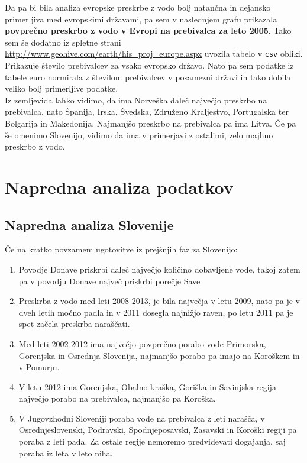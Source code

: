 \documentclass[11pt,a4paper]{article}
\begin{document}

\newpage

Da pa bi bila analiza evropske preskrbe z vodo bolj natančna in dejansko primerljiva med evropskimi državami, pa sem v naslednjem grafu prikazala \textbf{povprečno preskrbo z vodo v Evropi na prebivalca za leto 2005}. Tako sem še dodatno iz spletne strani \url{http://www.geohive.com/earth/his_proj_europe.aspx} uvozila tabelo v \verb|csv| obliki. Prikazuje število prebivalcev za vsako evropsko državo. Nato pa sem podatke iz tabele euro normirala z številom prebivalcev v posamezni državi in tako dobila veliko bolj primerljive podatke.\\

Iz zemljevida lahko vidimo, da ima Norveška daleč največjo preskrbo na prebivalca, nato Španija, Irska, Švedska, Združeno Kraljestvo, Portugalska ter Bolgarija in Makedonija. Najmanjšo preskrbo na prebivalca pa ima Litva.
Če pa še omenimo Slovenijo, vidimo da ima v primerjavi z ostalimi, zelo majhno preskrbo z vodo.


\newpage

\section{Napredna analiza podatkov}
\subsection{Napredna analiza Slovenije}

Če na kratko povzamem ugotovitve iz prejšnjih faz za Slovenijo:
\begin{enumerate} 
\item{Povodje Donave priskrbi daleč največjo količino dobavljene vode, takoj zatem pa v povodju Donave največ priskrbi porečje Save}
\item{Preskrba z vodo med leti 2008-2013, je bila največja v letu 2009, nato pa je v dveh letih močno padla in v 2011 dosegla najnižjo raven, po letu 2011 pa je spet začela preskrba naraščati.}
\item{Med leti 2002-2012 ima največjo povprečno porabo vode Primorska, Gorenjska in Osrednja Slovenija, najmanjšo porabo pa imajo na Koroškem in v Pomurju.}
\item{V letu 2012 ima Gorenjska, Obalno-kraška, Goriška in Savinjska regija največjo porabo na prebivalca, najmanjšo pa Koroška.}
\item{V Jugovzhodni Sloveniji poraba vode na prebivalca z leti narašča, v Osrednjeslovenski, Podravski, Spodnjeposavski, Zasavski in Koroški regiji pa poraba z leti pada. Za ostale regije nemoremo predvidevati dogajanja, saj poraba iz leta v leto niha.}
\end{enumerate}
\end{document}
